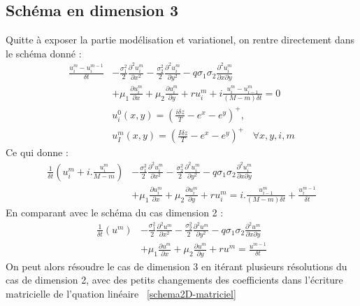 \documentclass{book}
\begin{document}
\subsection{Schéma en dimension 3}
Quitte à exposer la partie modélisation et variationel, on rentre directement dans le schéma donné :
\[
\begin{split}
\frac{u^m_i-u^{m-1}_i}{\delta t} 
& -\frac{\sigma_1^2}2\frac{\partial^2 u^m_i}{\partial x^2}
  -\frac{\sigma_2^2}2\frac{\partial^2 u^m_i}{\partial y^2}
  -q\sigma_1\sigma_2\frac{\partial^2 u^m_i}{\partial x\partial y} \\
& +\mu_1\frac{\partial u^m_i}{\partial x}
  +\mu_2 \frac{\partial u^m_i}{\partial y}+r u^m_i  
  +i\frac{u^m_{i}-u^m_{i-1}}{{(M-m)\delta t}}=0 \\
& u^0_i(x,y)=(\frac{i\delta z}T -e^x-e^y)^+, \\
& u^m_I(x,y)=(\frac{I\delta z}T -e^x-e^y)^+~~~~\forall x,y,i,m
\end{split}
\]
Ce qui donne :
\[
\begin{split}
\frac{1}{\delta t} (u^m_i+i.\frac{u^m_i}{M-m})
& -\frac{\sigma_1^2}2\frac{\partial^2 u^m_i}{\partial x^2}
  -\frac{\sigma_2^2}2\frac{\partial^2 u^m_i}{\partial y^2}
  -q\sigma_1\sigma_2\frac{\partial^2 u^m_i}{\partial x\partial y} \\
& +\mu_1\frac{\partial u^m_i}{\partial x}
  +\mu_2 \frac{\partial u^m_i}{\partial y}+r u^m_i  
  =i.\frac{u^m_{i-1}}{{(M-m)\delta t}} + \frac{u^{m-1}_i}{\delta t}
\end{split}
\]
En comparant avec le schéma du cas dimension 2 :
\[
\begin{split}
\frac{1}{\delta t} (u^m)
& -\frac{\sigma_1^2}2\frac{\partial^2 u^m}{\partial x^2}
  -\frac{\sigma_2^2}2\frac{\partial^2 u^m}{\partial y^2}
  -q\sigma_1\sigma_2\frac{\partial^2 u^m}{\partial x\partial y} \\
& +\mu_1\frac{\partial u^m}{\partial x}
  +\mu_2 \frac{\partial u^m}{\partial y}+r u^m 
  =\frac{u^{m-1}}{\delta t}
\end{split}
\]
On peut alors résoudre le cas de dimension 3 en itérant plusieurs résolutions du cas de dimension 2, avec des petits changements des coefficients dans l'écriture matricielle de l'quation linéaire ~\eqref{schema2D-matriciel}  
\end{document}
